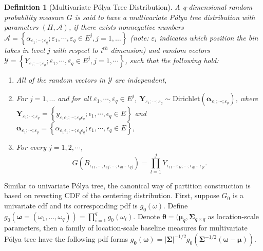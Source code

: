 \documentclass[12pt]{article}
\newtheorem{deff}[thm]{Definition}
\newcommand{\polya}{P\'{o}lya}
\begin{document}
\begin{deff}[Multivariate \polya{} Tree Distribution]
  A q-dimensional random probability measure $G$ is said to have a
  multivariate \polya{} tree distribution with parameters $(\Pi,
  \mathcal{A})$, if there exists nonnegative numbers
  $\mathcal{A}=\left\{ \alpha_{\varepsilon_1;\cdots;\varepsilon_q} ;
    \varepsilon_1, \cdots, \varepsilon_q \in E^j, j=1, \ldots
  \right\}$ (note: $\varepsilon_i$ indicates which position the bin
  takes in level $j$ with respect to $i^{th}$ dimension) and random
  vectors $\mathcal{Y} = \left\{
    Y_{\varepsilon_1;\cdots;\varepsilon_q} ; \varepsilon_1, \cdots,
    \varepsilon_q \in E^j, j=1, \cdots \right\}$, such that the
  following hold:
  \begin{enumerate}
  \item All of the random vectors in $\mathcal{Y}$ are independent,
  \item For $j=1, \ldots$ and for all $\varepsilon_1, \cdots,
    \varepsilon_q \in E^j$,
    $\bm{Y}_{\varepsilon_1;\cdots;\varepsilon_q} \sim
    \mathrm{Dirichlet}\left( \bm{\alpha}_{\varepsilon_1; \cdots;
        \varepsilon_q} \right)$, where
    $\bm{Y}_{\varepsilon_1;\cdots;\varepsilon_q} = \left\{
      y_{\varepsilon_1\epsilon_1; \cdots; \varepsilon_q\epsilon_q};
      \epsilon_1, \cdots, \epsilon_q \in E \right\}$ and
    $\bm{\alpha}_{\varepsilon_1; \cdots; \varepsilon_q} = \left\{
      \alpha_{\varepsilon_1\epsilon_1; \cdots;
        \varepsilon_q\epsilon_q}; \epsilon_1, \cdots, \epsilon_q \in E
    \right\}$,
  \item For every $j=1,2, \cdots$,
    \begin{displaymath}
      G(B_{\epsilon_{11},\cdots,
        \epsilon_{1j};\cdots;\epsilon_{q1}\cdots\epsilon_{qj}}) =
      \prod_{l=1}^j Y_{\epsilon_{11}\cdots \epsilon_{1l}; \cdots ;
        \epsilon_{q1}\cdots\epsilon_{ql}}.
    \end{displaymath}
  \end{enumerate}
\end{deff}

Similar to univariate \polya{} tree, the canonical way of partition
construction is based on reverting CDF of the centering
distribution. First, suppose $G_0$ is a univariate cdf and its
corresponding pdf is $g_0(\omega)$. Define $g_0(\bm{\omega}=(\omega_1,
\ldots, \omega_q)) = \prod_{i=1}^q g_0(\omega_i)$. Denote
$\bm{\theta}= (\bm{\mu}_q, \bm{\Sigma}_{q\times q}$ as location-scale
parameters, then a family of location-scale baseline measures for
multivariate \polya{} tree have the following pdf forms
$g_{\bm{\theta}} ( \bm{\omega}) = |\bm{\Sigma}|^{-1/2} g_0 (
\bm{\Sigma}^{-1/2} (\bm{\omega} - \bm{\mu}) ) $.
\end{document}
